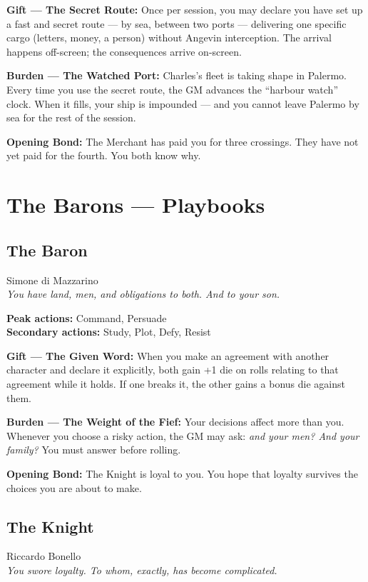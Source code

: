 \textbf{Gift --- The Secret Route:} Once per session, you may
declare you have set up a fast and secret route --- by sea, between
two ports --- delivering one specific cargo (letters, money, a
person) without Angevin interception. The arrival happens
off-screen; the consequences arrive on-screen.

\textbf{Burden --- The Watched Port:} Charles's fleet is taking
shape in Palermo. Every time you use the secret route, the GM
advances the ``harbour watch'' clock. When it fills, your ship is
impounded --- and you cannot leave Palermo by sea for the rest
of the session.

\textbf{Opening Bond:} The Merchant has paid you for three
crossings. They have not yet paid for the fourth. You both know why.

\secsep

\section{The Barons — Playbooks}

\subsection{The Baron}
{\cinzel\footnotesize\color{grigionote} Simone di Mazzarino}\\
\textit{You have land, men, and obligations to both. And to your son.}

\textbf{Peak actions:} Command, Persuade\\
\textbf{Secondary actions:} Study, Plot, Defy, Resist

\textbf{Gift --- The Given Word:} When you make an agreement with
another character and declare it explicitly, both gain +1 die on rolls
relating to that agreement while it holds. If one breaks it, the other
gains a bonus die against them.

\textbf{Burden --- The Weight of the Fief:} Your decisions affect
more than you. Whenever you choose a risky action, the GM may ask:
\textit{and your men? And your family?} You must answer before rolling.

\textbf{Opening Bond:} The Knight is loyal to you. You hope that
loyalty survives the choices you are about to make.

\filetto

\subsection{The Knight}
{\cinzel\footnotesize\color{grigionote} Riccardo Bonello}\\
\textit{You swore loyalty. To whom, exactly, has become complicated.}

